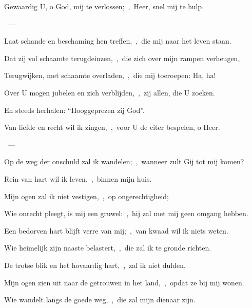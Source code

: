 \documentclass[12pt,twoside,a5paper]{article}
\begin{document}
\begin{halfparskip}
    Gewaardig U, o God, mij te verlossen;~\sep\ Heer, snel mij te hulp.

  ~--- 

  Laat schande en beschaming hen treffen,~\sep\ die mij naar het leven staan.

  Dat zij vol schaamte terugdeinzen,~\sep\ die zich over mijn rampen verheugen,

  Terugwijken, met schaamte overladen,~\sep\ die mij toeroepen: Ha, ha!

  Over U mogen jubelen en zich verblijden,~\sep\ zij allen, die U zoeken.

  En steeds herhalen: ``Hooggeprezen zij God''.
\end{halfparskip}

\begin{halfparskip}
    Van liefde en recht wil ik zingen,~\sep\ voor U de citer bespelen, o Heer.

  ~--- 

  Op de weg der onschuld zal ik wandelen;~\sep\ wanneer zult Gij tot mij komen?

  Rein van hart wil ik leven,~\sep\ binnen mijn huis.

  Mijn ogen zal ik niet vestigen,~\sep\ op ongerechtigheid;

  Wie onrecht pleegt, is mij een gruwel:~\sep\ hij zal met mij geen omgang hebben.

  Een bedorven hart blijft verre van mij;~\sep\ van kwaad wil ik niets weten.

  Wie heimelijk zijn naaste belastert,~\sep\ die zal ik te gronde richten.

  De trotse blik en het hovaardig hart,~\sep\ zal ik niet dulden.

  Mijn ogen zien uit naar de getrouwen in het land,~\sep\ opdat ze bij mij wonen.

  Wie wandelt langs de goede weg,~\sep\ die zal mijn dienaar zijn.
\end{halfparskip}
\end{document}
